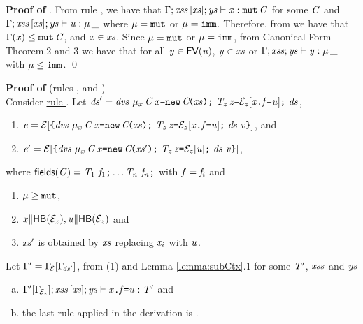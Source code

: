 \medskip
\noindent
{\bf Proof of }.
From rule  , we have that
${\Gamma};\mathit{xss}\,[\mathit{xs}];\mathit{ys}\vdash \mathit{x}:\texttt{mut}\,\mathit{C}$ for some $\mathit{C}$
and ${\Gamma};\mathit{xss}\,[\mathit{xs}];\mathit{ys}\vdash \mathit{u}:\mu\,\_$ where $\mu=\texttt{mut}$ or $\mu=\texttt{imm}$. Therefore, from  we have that $\Gamma(\mathit{x})\leq\texttt{mut}\,\mathit{C}$, and 
$\mathit{x}\in\mathit{xs}$.
Since $\mu=\texttt{mut}$ or $\mu=\texttt{imm}$, from Canonical Form Theorem.2 and 3 we have that for all  $\mathit{y}\in\textsf{FV}(\mathit{u})$, $\mathit{y}\in\mathit{xs}$ or ${\Gamma};\mathit{xss};\mathit{ys}\vdash \mathit{y}:\mu\,\_$ with $\mu\leq\texttt{imm}$.
\qed

\medskip
\noindent
{\bf Proof of  } (rules , and )\\
Consider \underline{rule }.
Let   $\decs'=\dvs\ \Dec{\Type{\mu_x}{\C}}{\x}{\ConstrCall{\C}{\xs}}\ \Dec{\T_z}{\z}{\ctx_z[{\FieldAssign{\x}{\f}{{\valPrime}}}]}\ \decs$, 
\begin{enumerate} [(1)]
\item $\e=\Ctx{\Block{\dvs\ \Dec{\Type{\mu_x}{\C}}{\x}{\ConstrCall{\C}{\xs}}\ \Dec{\T_z}{\z}{\ctx_z[{\FieldAssign{\x}{\f}{{\valPrime}}}]}\ \decs}{\val}}$, and 
\item $\e'=\Ctx{\Block{\dvs\ \Dec{\Type{\mu_x}{\C}}{\x}{\ConstrCall{\C}{\xs'}}\ \Dec{\T_z}{\z}{\ctx_z[\valPrime]}\ \decs}{\val}}$, 
\end{enumerate}
where $\textsf{fields}(\mathit{C})=\mathit{T}_1\ \mathit{f}_1\texttt{;}\ldots\mathit{T}_n\ \mathit{f}_n\texttt{;}$ with $\mathit{f}=\mathit{f}_i$ and
\begin{enumerate}[(1)]\addtocounter{enumi}{2}
\item ${\mu\geq\texttt{mut}}$,  
\item ${\mathit{x}{\parallel}\textsf{HB}({\cal{E}}_z),\mathit{u}{\parallel}\textsf{HB}({\cal{E}}_z)}$ and
\item $\mathit{xs}'$ is obtained by $\mathit{xs}$ replacing $\mathit{x}_i$ with $\mathit{u}$.
\end{enumerate}
Let $\Gamma'=\Gamma_{\!{\cal{E}}}[\Gamma_{\!\mathit{ds}'}]$, from (1) and Lemma \ref{lemma:subCtx}.1 for some
$\mathit{T}'$, $\mathit{xss}$ and $\mathit{ys}$
\begin{enumerate} [(a)]
\item $\Gamma'[\Gamma_{\!{\cal{E}}_z}];\mathit{xss}\,[\mathit{xs}];\mathit{ys}\vdash \mathit{x}\texttt{.}\mathit{f}\texttt{=}{\mathit{u}}:\mathit{T}'$ and
  \item the last rule applied in the derivation is .  
 \end{enumerate}
